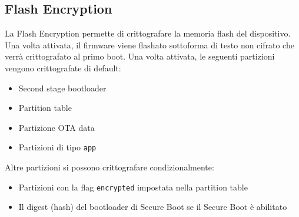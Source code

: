 \documentclass[a4paper]{article}
\begin{document}
\subsection{Flash Encryption}
La Flash Encryption permette di crittografare la memoria flash del dispositivo. Una volta
attivata, il firmware viene flashato sottoforma di testo non cifrato che verrà crittografato
al primo boot. Una volta attivata, le seguenti partizioni vengono crittografate di
default:
\begin{itemize}
  \item Second stage bootloader
  \item Partition table
  \item Partizione OTA data
  \item Partizioni di tipo \texttt{app}
\end{itemize}
Altre partizioni si possono crittografare condizionalmente:
\begin{itemize}
  \item Partizioni con la flag \texttt{encrypted} impostata nella partition table
  \item Il digest (hash) del bootloader di Secure Boot se il Secure Boot è abilitato
\end{itemize}
\end{document}
